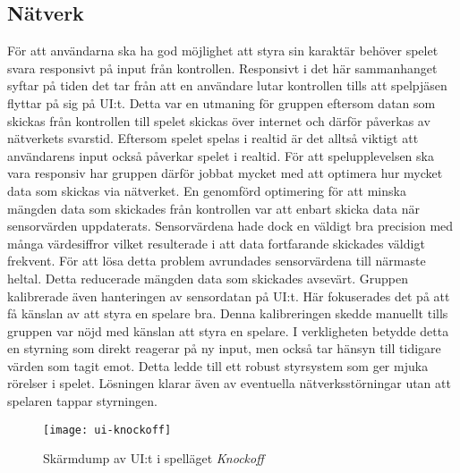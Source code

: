 \subsection{Nätverk}
För att användarna ska ha god möjlighet att styra sin karaktär behöver spelet svara responsivt på input från kontrollen. Responsivt i det här sammanhanget syftar på tiden det tar från att en användare lutar kontrollen tills att spelpjäsen flyttar på sig på UI:t. Detta var en utmaning för gruppen eftersom datan som skickas från kontrollen till spelet skickas över internet och därför påverkas av nätverkets svarstid. Eftersom spelet spelas i realtid är det alltså viktigt att användarens input också påverkar spelet i realtid. För att spelupplevelsen ska vara responsiv har gruppen därför jobbat mycket med att optimera hur mycket data som skickas via nätverket. En genomförd optimering för att minska mängden data som skickades från kontrollen var att enbart skicka data när sensorvärden uppdaterats. Sensorvärdena hade dock en väldigt bra precision med många värdesiffror vilket resulterade i att data fortfarande skickades väldigt frekvent. För att lösa detta problem avrundades sensorvärdena till närmaste heltal. Detta reducerade mängden data som skickades avsevärt. Gruppen kalibrerade även hanteringen av sensordatan på UI:t. Här fokuserades det på att få känslan av att styra en spelare bra. Denna kalibreringen skedde manuellt tills gruppen var nöjd med känslan att styra en spelare. I verkligheten betydde detta en styrning som direkt reagerar på ny input, men också tar hänsyn till tidigare värden som tagit emot. Detta ledde till ett robust styrsystem som ger mjuka rörelser i spelet. Lösningen klarar även av eventuella nätverksstörningar utan att spelaren tappar styrningen.

\begin{figure}[h]
    \centering
    \texttt{[image: ui-knockoff]}
    \caption{Skärmdump av UI:t i spelläget \textit{Knockoff}}
    \label{fig:ui-knockoff}
\end{figure}

